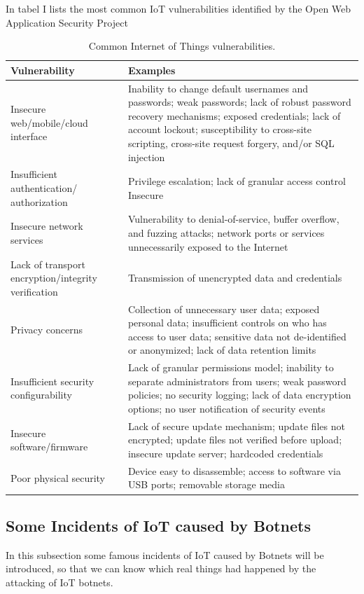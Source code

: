 \documentclass[conference]{IEEEtran}
\begin{document}
In tabel I \cite{b10} lists the most common IoT vulnerabilities identified by the Open Web Application Security Project 
\begin{table}[htbp]
\caption{Common Internet of Things vulnerabilities.\cite{b10}}
\begin{center}
\begin{tabular}{p{80pt}p{150pt}}
 \hline
\textbf{Vulnerability} & \textbf{Examples} \\ 
 \hline
Insecure web/mobile/cloud interface & Inability to change default usernames and passwords; weak passwords;  lack of
robust password recovery mechanisms; exposed credentials; lack of account lockout;
susceptibility to cross-site scripting, cross-site request forgery, and/or SQL injection \\ 
 \hline
 Insufficient authentication/
authorization & Privilege escalation; lack of granular access control
Insecure\\
 \hline
 Insecure network services & Vulnerability to denial-of-service, buffer overflow, and fuzzing attacks; network ports
or services unnecessarily exposed to the Internet\\
 \hline
 Lack of transport encryption/integrity
verification & Transmission of unencrypted data and credentials\\
 \hline
 Privacy concerns & Collection of unnecessary user data; exposed personal data; insufficient controls on
who has access to user data; sensitive data not de-identified or anonymized; lack of data
retention limits\\
 \hline
 Insufficient security configurability & Lack of granular permissions model; inability to separate administrators from users;
weak password policies; no security logging; lack of data encryption options; no user
notification of security events\\
 \hline
 Insecure software/firmware &Lack of secure update mechanism; update files not encrypted; update files not verified
before upload; insecure update server; hardcoded credentials\\
 \hline
 Poor physical security & Device easy to disassemble; access to software via USB ports; removable storage media\\
  \hline
\end{tabular}
\label{tab1}
\end{center}
\end{table}

\subsection{\textbf{Some Incidents of IoT caused by Botnets }}
In this subsection some famous incidents of IoT caused by Botnets will be introduced, so that we can know which real things had happened by the attacking of IoT botnets.
\end{document}
